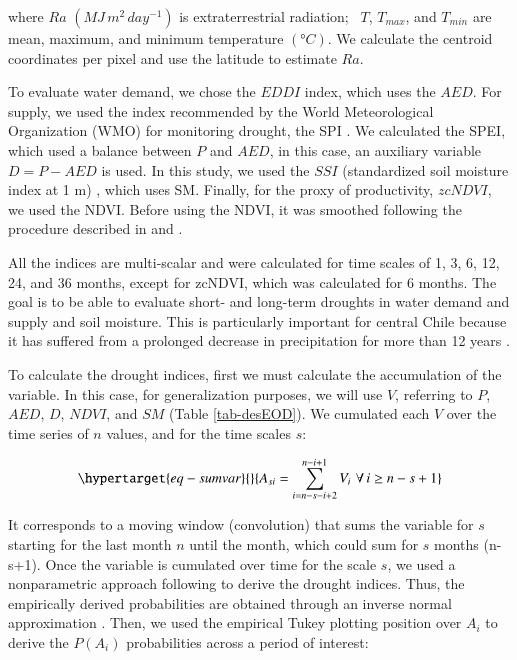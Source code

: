 \documentclass[
  number,
  preprint,
  3p,
  onecolumn]{elsarticle}
\begin{document}
where \(Ra\) \((MJ\,m^2\, day^{-1})\) is extraterrestrial radiation;
~\(T\), \(T_{max}\), and \(T_{min}\) are mean, maximum, and minimum
temperature \((°C)\). We calculate the centroid coordinates per pixel
and use the latitude to estimate \(Ra\).

To evaluate water demand, we chose the \(EDDI\)
\citep{Hobbins2016, McEvoy2016} index, which uses the \(AED\). For
supply, we used the index recommended by the World Meteorological
Organization (WMO) for monitoring drought, the SPI \citep{Mckee1993}. We
calculated the SPEI, which used a balance between \(P\) and \(AED\), in
this case, an auxiliary variable \(D = P-AED\) is used. In this study,
we used the \(SSI\) (standardized soil moisture index at 1 m)
\citep{Hao2013, AghaKouchak2014}, which uses SM. Finally, for the proxy
of productivity, \(zcNDVI\), we used the NDVI. Before using the NDVI, it
was smoothed following the procedure described in \citep{Zambrano2018}
and \citep{Zambrano2016}.

All the indices are multi-scalar and were calculated for time scales of
1, 3, 6, 12, 24, and 36 months, except for zcNDVI, which was calculated
for 6 months. The goal is to be able to evaluate short- and long-term
droughts in water demand and supply and soil moisture. This is
particularly important for central Chile because it has suffered from a
prolonged decrease in precipitation for more than 12 years
\citep{Garreaud2020, Boisier2018, Garreaud2017}.

To calculate the drought indices, first we must calculate the
accumulation of the variable. In this case, for generalization purposes,
we will use \(V\), referring to \(P\), \(AED\), \(D\), \(NDVI\), and
\(SM\) (Table \ref{tab-desEOD}). We cumulated each \(V\) over the time
series of \(n\) values, and for the time scales \(s\):

\begin{equation}\protect\hypertarget{eq-sumvar}{}{A_{si} = \sum_{i=n-s-i+2}^{n-i+1} V_i\,\, \forall\, i\geq n-s+1  }\label{eq-sumvar}\end{equation}

It corresponds to a moving window (convolution) that sums the variable
for \(s\) starting for the last month \(n\) until the month, which could
sum for \(s\) months (n-s+1). Once the variable is cumulated over time
for the scale \(s\), we used a nonparametric approach following
\citep{Hobbins2016} to derive the drought indices. Thus, the empirically
derived probabilities are obtained through an inverse normal
approximation \citep{Abramowitz1968}. Then, we used the empirical Tukey
plotting position \citep{Wilks2011} over \(A_i\) to derive the
\(P(A_i)\) probabilities across a period of interest:
\end{document}
